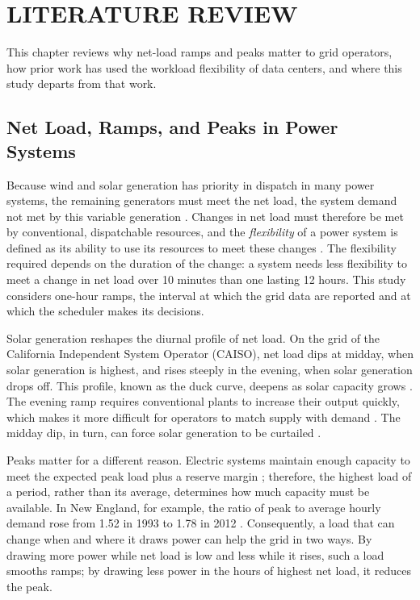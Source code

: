 \documentclass{UNCC-thesis}
\begin{document}
\chapter{LITERATURE REVIEW}
\label{chap:literature}

This chapter reviews why net-load ramps and peaks matter to grid operators, how prior work has
used the workload flexibility of data centers, and where this study departs from that work.

\section{Net Load, Ramps, and Peaks in Power Systems}
\label{sec:lit-net-load}

Because wind and solar generation has priority in dispatch in many power systems, the remaining
generators must meet the net load, the system demand not met by this variable generation
\cite{lannoye2012assessment}. Changes in net load must therefore be met by conventional,
dispatchable resources, and the \emph{flexibility} of a power system is defined as its ability to
use its resources to meet these changes \cite{lannoye2012assessment}. The flexibility required
depends on the duration of the change: a system needs less flexibility to meet a change in net
load over 10 minutes than one lasting 12 hours. This study considers one-hour ramps, the interval
at which the grid data are reported and at which the scheduler makes its decisions.

Solar generation reshapes the diurnal profile of net load. On the grid of the California
Independent System Operator (CAISO), net load dips at midday, when solar generation is highest,
and rises steeply in the evening, when solar generation drops off. This profile, known as the
duck curve, deepens as solar capacity grows \cite{eia2023duckcurve}. The evening ramp requires
conventional plants to increase their output quickly, which makes it more difficult for operators
to match supply with demand \cite{eia2023duckcurve}. The midday dip, in turn, can force solar
generation to be curtailed \cite{denholm2015overgeneration}.

Peaks matter for a different reason. Electric systems maintain enough capacity to meet the
expected peak load plus a reserve margin \cite{eia2014peakratio}; therefore, the highest load of a
period, rather than its average, determines how much capacity must be available. In New England,
for example, the ratio of peak to average hourly demand rose from 1.52 in 1993 to 1.78 in 2012
\cite{eia2014peakratio}. Consequently, a load that can change when and where it draws power can
help the grid in two ways. By drawing more power while net load is low and less while it rises,
such a load smooths ramps; by drawing less power in the hours of highest net load, it reduces the
peak.
\end{document}
